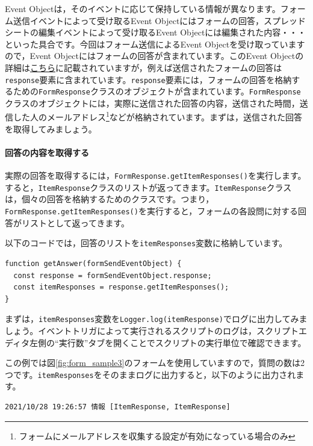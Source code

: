 \documentclass[uplatex,a4j]{jsarticle}
\begin{document}
Event Objectは，そのイベントに応じて保持している情報が異なります。フォーム送信イベントによって受け取るEvent Objectにはフォームの回答，スプレッドシートの編集イベントによって受け取るEvent Objectには編集された内容・・・といった具合です。今回はフォーム送信によるEvent Objectを受け取っていますので，Event Objectにはフォームの回答が含まれています。このEvent Objectの詳細は\href{https://developers.google.com/apps-script/guides/triggers/events?hl=en#form-submit_1}{こちら}に記載されていますが，例えば送信されたフォームの回答は\verb|response|要素に含まれています。\verb|response|要素には，フォームの回答を格納するための\verb|FormResponse|クラスのオブジェクトが含まれています。\verb|FormResponse|クラスのオブジェクトには，実際に送信された回答の内容，送信された時間，送信した人のメールアドレス\footnote{フォームにメールアドレスを収集する設定が有効になっている場合のみ}などが格納されています。まずは，送信された回答を取得してみましょう。

\paragraph{回答の内容を取得する}

実際の回答を取得するには，\verb|FormResponse.getItemResponses()|を実行します。すると，\verb|ItemResponse|クラスのリストが返ってきます。\verb|ItemResponse|クラスは，個々の回答を格納するためのクラスです。つまり，\verb|FormResponse.getItemResponses()|を実行すると，フォームの各設問に対する回答がリストとして返ってきます。

以下のコードでは，回答のリストを\verb|itemResponses|変数に格納しています。

\begin{lstlisting}[basicstyle=\ttfamily\footnotesize,frame=single,caption=Event Object sample 2]
function getAnswer(formSendEventObject) {
  const response = formSendEventObject.response;
  const itemResponses = response.getItemResponses();
}
\end{lstlisting}

まずは，\verb|itemResponses|変数を\verb|Logger.log(itemResponse)|でログに出力してみましょう。イベントトリガによって実行されるスクリプトのログは，スクリプトエディタ左側の``実行数''タブを開くことでスクリプトの実行単位で確認できます。

この例では図\ref{fig:form_sample3}のフォームを使用していますので，質問の数は2つです。\verb|itemResponses|をそのままログに出力すると，以下のように出力されます。

\begin{lstlisting}[basicstyle=\ttfamily\footnotesize,frame=single,caption=Event Object output example 1]
2021/10/28 19:26:57	情報 [ItemResponse, ItemResponse]
\end{lstlisting}
\end{document}

